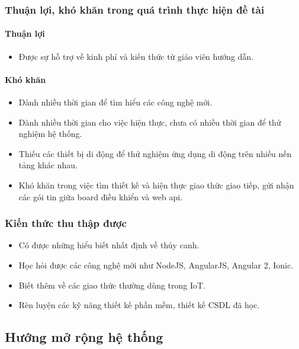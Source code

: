 \documentclass[a4paper,12pt,oneside]{article}
\begin{document}
	\subsubsection{Thuận lợi, khó khăn trong quá trình thực hiện đề tài}	
	\paragraph{Thuận lợi}
		\begin{itemize}
		\item Được sự hỗ trợ về kinh phí và kiến thức từ giáo viên hướng dẫn. 
		\end{itemize}
	\paragraph{Khó khăn}
		\begin{itemize}
		\item Dành nhiều thời gian để tìm hiểu các công nghệ mới. 

		\item Dành nhiều thời gian cho việc hiện thực, chưa có nhiều thời gian để thử nghiệm hệ thống. 

		\item Thiếu các thiết bị di động để thử nghiệm ứng dụng di động trên nhiều nền tảng khác nhau. 

		\item  Khó khăn trong việc tìm thiết kế và hiện thực giao thức giao tiếp, gửi nhận các gói tin giữa board điều khiển và web api. 
		\end{itemize}

\subsubsection{Kiến thức thu thập được}
\begin{itemize}
\item Có được những hiểu biết nhất định về thủy canh. 

\item Học hỏi được các công nghệ mới như NodeJS, AngularJS, Angular 2, Ionic. 

\item Biết thêm về các giao thức thường dùng trong IoT. 

\item Rèn luyện các kỹ năng thiết kế phần mềm, thiết kế CSDL đã học. 
\end{itemize}

	
\subsection{Hướng mở rộng hệ thống}
\end{document}
